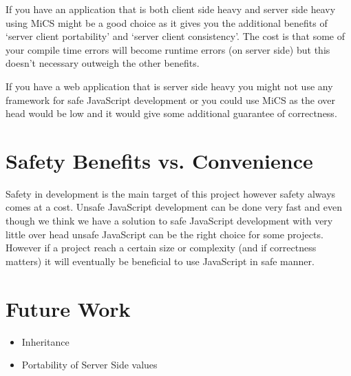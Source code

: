 	If you have an application that is both client side heavy and server side heavy using MiCS might be a good choice as it gives you the additional benefits of ‘server client portability’ and ‘server client consistency’. The cost is that some of your compile time errors will become runtime errors (on server side) but this doesn’t necessary outweigh the other benefits. 

	If you have a web application that is server side heavy you might not use any framework for safe JavaScript development or you could use MiCS as the over head would be low and it would give some additional guarantee of correctness.



\section{Safety Benefits vs. Convenience} %
\label{sec:safety_benefits_vs_conveniente}
	Safety in development is the main target of this project however safety always comes at a cost. Unsafe JavaScript development can be done very fast and even though we think we have a solution to safe JavaScript development with very little over head unsafe JavaScript can be the right choice for some projects. However if a project reach a certain size or complexity (and if correctness matters) it will eventually be beneficial to use JavaScript in safe manner.

\section{Future Work}
\begin{itemize}
	\item Inheritance
	\item Portability of Server Side values
\end{itemize}